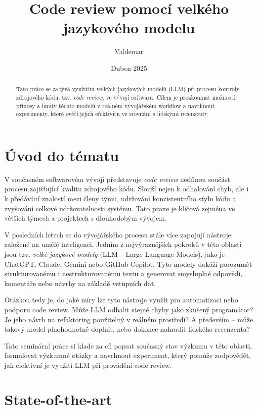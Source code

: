 \documentclass[12pt, a4paper]{article}
\title{Code review pomocí velkého jazykového modelu}
\author{Valdemar}
\date{Duben 2025}
\begin{document}
\maketitle

\begin{abstract}
Tato práce se zabývá využitím velkých jazykových modelů (LLM) při procesu kontroly zdrojového kódu, tzv. \textit{code review}, ve vývoji softwaru. Cílem je prozkoumat možnosti, přínosy a limity těchto modelů v reálném vývojářském workflow a navrhnout experimenty, které ověří jejich efektivitu ve srovnání s lidskými recenzenty.
\end{abstract}

\section{Úvod do tématu}

V současném softwarovém vývoji představuje \textit{code review} nedílnou součást procesu zajišťující kvalitu zdrojového kódu. Slouží nejen k odhalování chyb, ale i k předávání znalostí mezi členy týmu, udržování konzistentního stylu kódu a zvyšování celkové udržovatelnosti systému. Tato praxe je klíčová zejména ve větších týmech a projektech s dlouhodobým vývojem.

V posledních letech se do vývojářského procesu stále více zapojují nástroje založené na umělé inteligenci. Jedním z nejvýraznějších pokroků v této oblasti jsou tzv. \textit{velké jazykové modely} (LLM – Large Language Models), jako je ChatGPT, Claude, Gemini nebo GitHub Copilot. Tyto modely dokáží porozumět strukturovanému i nestrukturovanému textu a generovat smysluplné odpovědi, komentáře nebo návrhy na základě vstupních dat.

Otázkou tedy je, do jaké míry lze tyto nástroje využít pro automatizaci nebo podporu code review. Může LLM odhalit stejné chyby jako zkušený programátor? Je jeho návrh na refaktoring použitelný v reálném prostředí? A především – může takový model plnohodnotně doplnit, nebo dokonce nahradit lidského recenzenta?

Tato seminární práce si klade za cíl popsat současný stav výzkumu v této oblasti, formulovat výzkumné otázky a navrhnout experiment, který pomůže zodpovědět, jak efektivní je využití LLM při provádění code review.

\newpage



\section{State-of-the-art}
\end{document}

